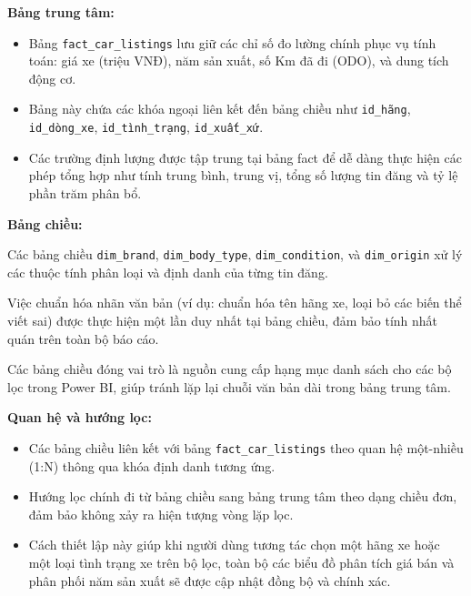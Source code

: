 \noindent\textbf{Bảng trung tâm:}
\begin{itemize}[leftmargin=1.0cm]
    \item Bảng \texttt{fact\_car\_listings} lưu giữ các chỉ số đo lường chính phục vụ tính toán: giá xe (triệu VNĐ), năm sản xuất, số Km đã đi (ODO), và dung tích động cơ.
    \item Bảng này chứa các khóa ngoại liên kết đến bảng chiều như \texttt{id\_hãng}, \texttt{id\_dòng\_xe}, \texttt{id\_tình\_trạng}, \texttt{id\_xuất\_xứ}.
    \item Các trường định lượng được tập trung tại bảng fact để dễ dàng thực hiện các phép tổng hợp như tính trung bình, trung vị, tổng số lượng tin đăng và tỷ lệ phần trăm phân bổ.
\end{itemize}

\noindent\textbf{Bảng chiều:}
\begin{itemize}[leftmargin=1.0cm]
    \begin{sloppypar}
    \item Các bảng chiều \texttt{dim\_brand}, \texttt{dim\_body\_type}, \texttt{dim\_condition}, và \texttt{dim\_origin} xử lý các thuộc tính phân loại và định danh của từng tin đăng.
    \end{sloppypar}
    \item Việc chuẩn hóa nhãn văn bản (ví dụ: chuẩn hóa tên hãng xe, loại bỏ các biến thể viết sai) được thực hiện một lần duy nhất tại bảng chiều, đảm bảo tính nhất quán trên toàn bộ báo cáo.
    \item Các bảng chiều đóng vai trò là nguồn cung cấp hạng mục danh sách cho các bộ lọc trong Power BI, giúp tránh lặp lại chuỗi văn bản dài trong bảng trung tâm.
\end{itemize}

\noindent\textbf{Quan hệ và hướng lọc:}
\begin{itemize}[leftmargin=1.0cm]
    \item Các bảng chiều liên kết với bảng \texttt{fact\_car\_listings} theo quan hệ một-nhiều (1:N) thông qua khóa định danh tương ứng.
    \item Hướng lọc chính đi từ bảng chiều sang bảng trung tâm theo dạng chiều đơn, đảm bảo không xảy ra hiện tượng vòng lặp lọc.
    \item Cách thiết lập này giúp khi người dùng tương tác chọn một hãng xe hoặc một loại tình trạng xe trên bộ lọc, toàn bộ các biểu đồ phân tích giá bán và phân phối năm sản xuất sẽ được cập nhật đồng bộ và chính xác.
\end{itemize}

